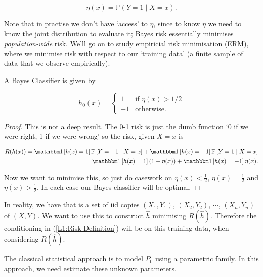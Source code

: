 \documentclass[11pt]{scrartcl}
\begin{document}
\begin{equation}
    \eta(x) = \mathbb{P}(Y=1\mid X=x).
    \label{L1:Regression Function}
\end{equation}

Note that in practise we don't have `access' to $\eta$, since to know $\eta$ we need to know the joint distribution to evaluate it; Bayes risk essentially minimises \textit{population-wide} risk. We'll go on to study empiricial risk minimisation (ERM), where we minimise risk with respect to our `training data' (a finite sample of data that we observe empirically).

\begin{theorem}
\label{not deep Bayes}
A Bayes Classifier is given by 

\begin{equation}
    h_0(x) = 
    \begin{cases} 
      1 & \text{if $\eta(x) > 1/2$} \\
      -1 & \text{otherwise.}
   \end{cases}
\label{L1:Bayes Example}
\end{equation}

\begin{proof}
This is not a deep result. The 0-1 risk is just the dumb function `0 if we were right, 1 if we were wrong' so the risk, given $X=x$ is

\begin{align*}
    R(h(x)) = \one{h(x) = 1} \P{Y = -1 \mid X = x} + \one{h(x) = -1} \P{Y = 1 \mid X = x} \\
    = \one{h(x) = 1} (1 - \eta(x)) + \one{h(x) = -1} \eta(x).
\end{align*}

Now we want to minimise this, so just do casework on $\eta(x) < \frac12$, $\eta(x) = \frac12$ and $\eta(x) > \frac12$. In each case our Bayes classifier will be optimal.
\end{proof}

\end{theorem}

In reality, we have  that is a set of iid copies $(X_1, Y_1)$, $(X_2, Y_2)$, $\cdots$, $(X_n, Y_n)$ of $(X, Y)$. We want to use this to construct $\hat{h}$ minimising $R(\hat{h})$. Therefore the conditioning in (\ref{L1:Risk Definition}) will be on this training data, when considering $R(\hat{h})$.

The classical statistical approach is to model $P_0$ using a parametric family. In this approach, we need estimate these unknown parameters.
\end{document}
